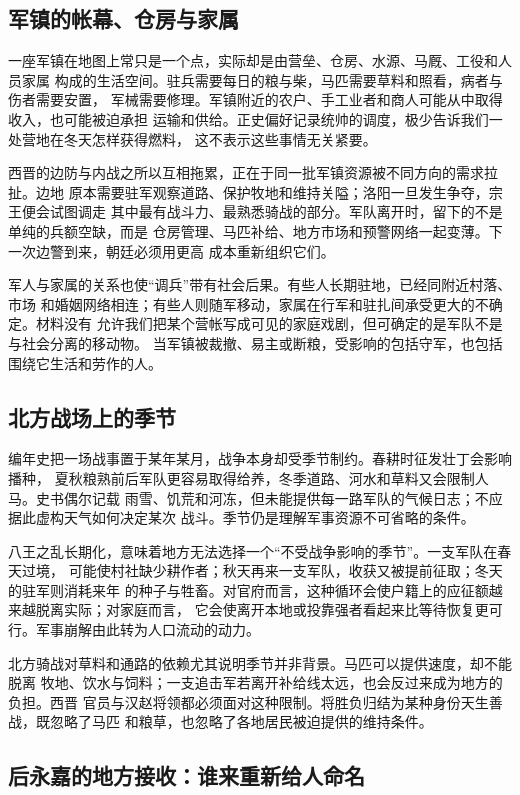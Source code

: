 \subsection{军镇的帐幕、仓房与家属}

一座军镇在地图上常只是一个点，实际却是由营垒、仓房、水源、马厩、工役和人员家属
构成的生活空间。驻兵需要每日的粮与柴，马匹需要草料和照看，病者与伤者需要安置，
军械需要修理。军镇附近的农户、手工业者和商人可能从中取得收入，也可能被迫承担
运输和供给。正史偏好记录统帅的调度，极少告诉我们一处营地在冬天怎样获得燃料，
这不表示这些事情无关紧要。

西晋的边防与内战之所以互相拖累，正在于同一批军镇资源被不同方向的需求拉扯。边地
原本需要驻军观察道路、保护牧地和维持关隘；洛阳一旦发生争夺，宗王便会试图调走
其中最有战斗力、最熟悉骑战的部分。军队离开时，留下的不是单纯的兵额空缺，而是
仓房管理、马匹补给、地方市场和预警网络一起变薄。下一次边警到来，朝廷必须用更高
成本重新组织它们。

军人与家属的关系也使“调兵”带有社会后果。有些人长期驻地，已经同附近村落、市场
和婚姻网络相连；有些人则随军移动，家属在行军和驻扎间承受更大的不确定。材料没有
允许我们把某个营帐写成可见的家庭戏剧，但可确定的是军队不是与社会分离的移动物。
当军镇被裁撤、易主或断粮，受影响的包括守军，也包括围绕它生活和劳作的人。

\subsection{北方战场上的季节}

编年史把一场战事置于某年某月，战争本身却受季节制约。春耕时征发壮丁会影响播种，
夏秋粮熟前后军队更容易取得给养，冬季道路、河水和草料又会限制人马。史书偶尔记载
雨雪、饥荒和河冻，但未能提供每一路军队的气候日志；不应据此虚构天气如何决定某次
战斗。季节仍是理解军事资源不可省略的条件。

八王之乱长期化，意味着地方无法选择一个“不受战争影响的季节”。一支军队在春天过境，
可能使村社缺少耕作者；秋天再来一支军队，收获又被提前征取；冬天的驻军则消耗来年
的种子与牲畜。对官府而言，这种循环会使户籍上的应征额越来越脱离实际；对家庭而言，
它会使离开本地或投靠强者看起来比等待恢复更可行。军事崩解由此转为人口流动的动力。

北方骑战对草料和通路的依赖尤其说明季节并非背景。马匹可以提供速度，却不能脱离
牧地、饮水与饲料；一支追击军若离开补给线太远，也会反过来成为地方的负担。西晋
官员与汉赵将领都必须面对这种限制。将胜负归结为某种身份天生善战，既忽略了马匹
和粮草，也忽略了各地居民被迫提供的维持条件。

\subsection{后永嘉的地方接收：谁来重新给人命名}

